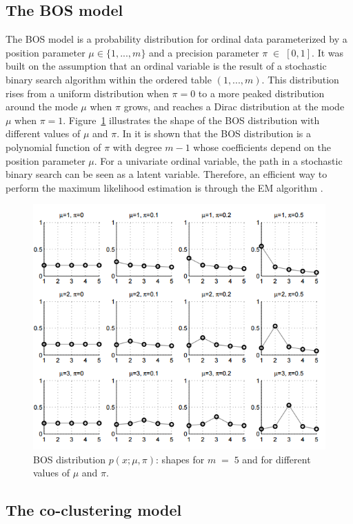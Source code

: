 \subsection{The BOS model}
\label{sec:BOS}
The BOS model \citep{biernacki16} is a probability distribution for ordinal data parameterized by a position parameter $\mu \in \{1,...,m\}$ and a precision parameter $\pi \;\in\; [0,1]$. It was built on the assumption that an ordinal variable is the result of a stochastic binary search algorithm within the ordered table $\left(1,...,m\right)$. This distribution rises from a uniform distribution when $\pi=0$ to a more peaked distribution around the mode $\mu$ when $\pi$ grows, and reaches a Dirac distribution at the mode $\mu$ when $\pi=1$. Figure~\ref{fig:bos} illustrates the shape of the BOS distribution with different values of $\mu$ and $\pi$. In \citet{biernacki16} it is shown that the BOS distribution is a polynomial function of $\pi$ with degree $m-1$ whose coefficients depend on the position parameter $\mu$. For a univariate ordinal variable, the path in a stochastic binary search can be seen as a latent variable. Therefore, an efficient way to perform the maximum likelihood estimation is through the EM algorithm \citep{Dempster77}.

\begin{figure}[ht!]
\centering
  \includegraphics[width = .7\textwidth]{images/BOS.PNG}
    \caption{BOS distribution $p\left(x;\mu,\pi\right)$: shapes for $m\;=\;5$ and for different values of $\mu$ and $\pi$.}
    \label{fig:bos}
\end{figure}

\subsection{The co-clustering model}
\label{sec:coclust}

